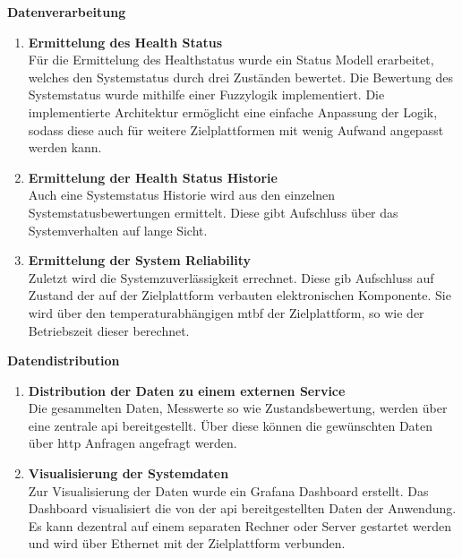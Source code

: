 \textbf{Datenverarbeitung}
\begin{enumerate}
    \item \textbf{Ermittelung des Health Status}\\
    Für die Ermittelung des Healthstatus wurde ein Status Modell erarbeitet, welches den Systemstatus durch drei Zuständen bewertet. Die Bewertung des Systemstatus wurde mithilfe einer Fuzzylogik implementiert. Die implementierte Architektur ermöglicht eine einfache Anpassung der Logik, sodass diese auch für weitere Zielplattformen mit wenig Aufwand angepasst werden kann.  
    \item \textbf{Ermittelung der Health Status Historie}\\
    Auch eine Systemstatus Historie wird aus den einzelnen Systemstatusbewertungen ermittelt. Diese gibt Aufschluss über das Systemverhalten auf lange Sicht.  
    \item \textbf{Ermittelung der System Reliability}\\
    Zuletzt wird die Systemzuverlässigkeit errechnet. Diese gib Aufschluss auf Zustand der auf der Zielplattform verbauten elektronischen Komponente. Sie wird über den temperaturabhängigen \ac{mtbf} der Zielplattform, so wie der Betriebszeit dieser berechnet. 
\end{enumerate}

\textbf{Datendistribution}
\begin{enumerate}
    \item \textbf{Distribution der Daten zu einem externen Service}\\
    Die gesammelten Daten, Messwerte so wie Zustandsbewertung, werden über eine zentrale \ac{api} bereitgestellt. Über diese können die gewünschten Daten über \ac{http} Anfragen angefragt werden.   
    \item \textbf{Visualisierung der Systemdaten}\\
    Zur Visualisierung der Daten wurde ein Grafana Dashboard erstellt. Das Dashboard visualisiert die von der \ac{api} bereitgestellten Daten der Anwendung. Es kann dezentral auf einem separaten Rechner oder Server gestartet werden und wird über Ethernet mit der Zielplattform verbunden. 
\end{enumerate}